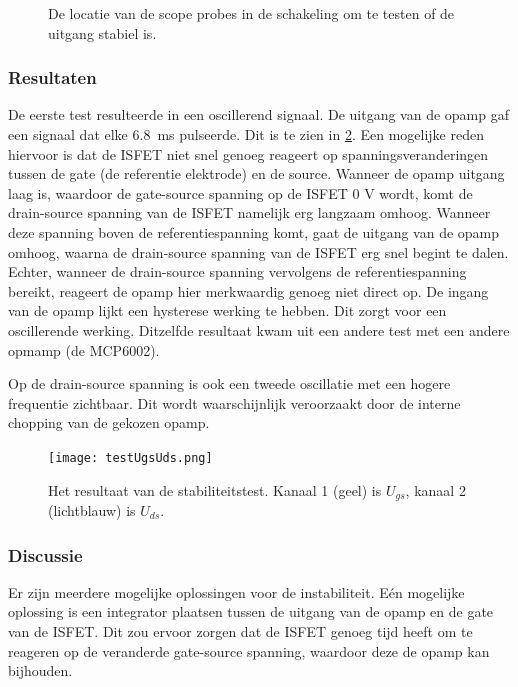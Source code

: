 \begin{figure}[ht]
    \centering
    \def\svgwidth{0.75\textwidth}
    
    \caption{De locatie van de scope probes in de schakeling om te testen of de uitgang stabiel is.}
    \label{fig:test ISFET circuit best}
\end{figure}


\subsubsection{Resultaten}

De eerste test resulteerde in een oscillerend signaal. De uitgang van de opamp gaf een signaal dat elke \qty{6.8}{\milli\second} pulseerde. Dit is te zien in \cref{fig:resultUgsUds}.
Een mogelijke reden hiervoor is dat de ISFET niet snel genoeg reageert op spanningsveranderingen tussen de gate (de referentie elektrode) en de source. Wanneer de opamp uitgang laag is, waardoor de gate-source spanning op de ISFET 0 V wordt, komt de drain-source spanning van de ISFET namelijk erg langzaam omhoog. Wanneer deze spanning boven de referentiespanning komt, gaat de uitgang van de opamp omhoog, waarna de drain-source spanning van de ISFET erg snel begint te dalen. Echter, wanneer de drain-source spanning vervolgens de referentiespanning bereikt, reageert de opamp hier merkwaardig genoeg niet direct op. De ingang van de opamp lijkt een hysterese werking te hebben. Dit zorgt voor een oscillerende werking. Ditzelfde resultaat kwam uit een andere test met een andere opmamp (de MCP6002).

Op de drain-source spanning is ook een tweede oscillatie met een hogere frequentie zichtbaar. Dit wordt waarschijnlijk veroorzaakt door de interne chopping van de gekozen opamp.


\begin{figure}[ht]
    \centering
    \def\svgwidth{0.75\textwidth}
    \texttt{[image: testUgsUds.png]}
    \caption{Het resultaat van de stabiliteitstest. Kanaal 1 (geel) is $U_{gs}$, kanaal 2 (lichtblauw) is $U_{ds}$.}
    \label{fig:resultUgsUds}
\end{figure}


\subsubsection{Discussie}
Er zijn meerdere mogelijke oplossingen voor de instabiliteit.
Eén mogelijke oplossing is een integrator plaatsen tussen de uitgang van de opamp en de gate van de ISFET. Dit zou ervoor zorgen dat de ISFET genoeg tijd heeft om te reageren op de veranderde gate-source spanning, waardoor deze de opamp kan bijhouden.


